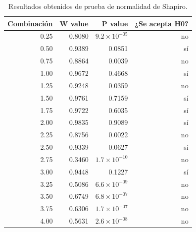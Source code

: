 \documentclass{article}
\begin{document}
\begin{table}[ht]
    \centering
    \caption{Resultados obtenidos de prueba de normalidad de Shapiro.} 
    \begin{tabular}{|r|r|r|r|}
    \hline
    Combinaci\'on & W value & P value & ¿Se acepta H0?  \\
    \hline
    0.25 & 0.8080 & $9.2\times 10^{-05}$ & no \\
    \hline 
    0.50 & 0.9389 & 0.0851 & s\'i  \\
    \hline 
    0.75 & 0.8864 & 0.0039 & no \\
    \hline
    1.00 & 0.9672 & 0.4668 & s\'i \\
    \hline
    1.25 & 0.9248 & 0.0359 & no \\
    \hline
    1.50 & 0.9761 & 0.7159 & s\'i \\
    \hline
    1.75 & 0.9722 & 0.6035 & s\'i \\
    \hline
    2.00 & 0.9835 & 0.9089 & s\'i \\
    \hline
    2.25 & 0.8756 & 0.0022 & no \\
    \hline
    2.50 & 0.9339 & 0.0627 & s\'i \\
    \hline
    2.75 & 0.3460 & $1.7\times 10^{-10}$ & no \\
    \hline
    3.00 & 0.9448 & 0.1227 & s\'i \\
    \hline
    3.25 & 0.5086 & $6.6\times 10^{-09}$ & no \\
    \hline
    3.50 & 0.6749 & $6.8\times 10^{-07}$ & no \\
    \hline
    3.75 & 0.6306 & $1.7\times 10^{-07}$ & no \\
    \hline
    4.00 & 0.5631 & $2.6\times 10^{-08}$ & no \\
    \hline
\end{tabular}
    \label{cuadro 1}
\end{table}
\newpage 
\end{document}
